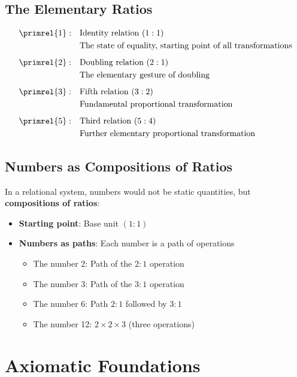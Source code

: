 	\subsection{The Elementary Ratios}
	
	\begin{definition}
		\begin{align}
			\primrel{1}: \quad &\text{Identity relation } (1:1) \\
			&\text{The state of equality, starting point of all transformations} \\[0.5em]
			\primrel{2}: \quad &\text{Doubling relation } (2:1) \\
			&\text{The elementary gesture of doubling} \\[0.5em]
			\primrel{3}: \quad &\text{Fifth relation } (3:2) \\
			&\text{Fundamental proportional transformation} \\[0.5em]
			\primrel{5}: \quad &\text{Third relation } (5:4) \\
			&\text{Further elementary proportional transformation}
		\end{align}
	\end{definition}
	
	\subsection{Numbers as Compositions of Ratios}
	
	In a relational system, numbers would not be static quantities, but \textbf{compositions of ratios}:
	
	\begin{itemize}
		\item \textbf{Starting point}: Base unit $(1:1)$
		\item \textbf{Numbers as paths}: Each number is a path of operations
		\begin{itemize}
			\item The number 2: Path of the $2:1$ operation
			\item The number 3: Path of the $3:1$ operation  
			\item The number 6: Path $2:1$ followed by $3:1$
			\item The number 12: $2 \times 2 \times 3$ (three operations)
		\end{itemize}
	\end{itemize}
	
	\section{Axiomatic Foundations}
	
